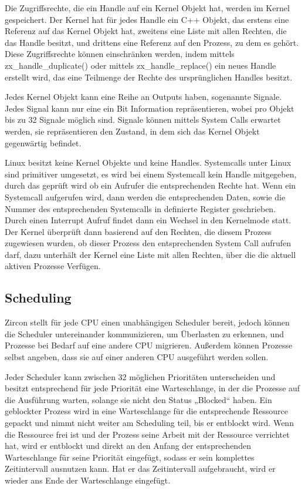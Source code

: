 \documentclass[a4paper]{scrartcl}
\begin{document}
Die Zugriffsrechte, die ein Handle auf ein Kernel Objekt hat, werden im Kernel gespeichert. Der Kernel hat für jedes Handle ein C++ Objekt, das erstens eine Referenz auf das Kernel Objekt hat, zweitens eine Liste mit allen Rechten, die das Handle besitzt, und drittens eine Referenz auf den Prozess, zu dem es gehört. Diese Zugriffsrechte können einschränken werden, indem mittels zx\_handle\_duplicate() \cite{Fuchsia.HandleDuplicate} oder mittels zx\_handle\_replace() \cite{Fuchsia.HandleReplace} ein neues Handle erstellt wird, das eine Teilmenge der Rechte des ursprünglichen Handles besitzt. \cite{Fuchsia.Zircon.Handles}

Jedes Kernel Objekt kann eine Reihe an Outputs haben, sogenannte Signale. Jedes Signal kann nur eine ein Bit Information repräsentieren, wobei pro Objekt bis zu 32 Signale möglich sind. Signale können mittels System Calls erwartet werden, sie repräsentieren den Zustand, in dem sich das Kernel Objekt gegenwärtig befindet. \cite{Fuchsia.Zircon.Signals}

Linux besitzt keine Kernel Objekte und keine Handles. Systemcalls unter Linux sind primitiver umgesetzt, es wird bei einem Systemcall kein Handle mitgegeben, durch das geprüft wird ob ein Aufrufer die entsprechenden Rechte hat. Wenn ein Systemcall aufgerufen wird, dann werden die entsprechenden Daten, sowie die Nummer des entsprechenden Systemcalls in definierte Register geschrieben. Durch einen Interrupt Aufruf findet dann ein Wechsel in den Kernelmode statt. Der Kernel überprüft dann basierend auf den Rechten, die diesem Prozess zugewiesen wurden, ob dieser Prozess den entsprechenden System Call aufrufen darf, dazu unterhält der Kernel eine Liste mit allen Rechten, über die die aktuell aktiven Prozesse Verfügen. \cite{Android.Kernel.Capabilities}
\subsection{Scheduling}
Zircon stellt für jede CPU einen unabhängigen Scheduler bereit, jedoch können die Scheduler untereinander kommunizieren, um Überlasten zu erkennen, und Prozesse bei Bedarf auf eine andere CPU migrieren. Außerdem können Prozesse selbst angeben, dass sie auf einer anderen CPU ausgeführt werden sollen.

Jeder Scheduler kann zwischen 32 möglichen Prioritäten unterscheiden und besitzt entsprechend für jede Priorität eine Warteschlange, in der die Prozesse auf die Ausführung warten, solange sie nicht den Status „Blocked“ haben. Ein geblockter Prozess wird in eine Warteschlange für die entsprechende Ressource gepackt und nimmt nicht weiter am Scheduling teil, bis er entblockt wird. Wenn die Ressource frei ist und der Prozess seine Arbeit mit der Ressource verrichtet hat, wird er entblockt und direkt an den Anfang der entsprechenden Warteschlange für seine Priorität eingefügt, sodass er sein komplettes Zeitintervall ausnutzen kann. Hat er das Zeitintervall aufgebraucht, wird er wieder ans Ende der Warteschlange eingefügt. \cite{Fuchsia.Zircon.Scheduling}
\end{document}
